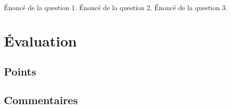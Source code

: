 \documentclass[12pt,addpoints,french,a4paper,oneside]{exam}
\begin{document}
\pagestyle{foot}


\begin{questions}

	\question[3] Énoncé de la question 1.
	\question[2] Énoncé de la question 2.
	\question[3] Énoncé de la question 3.

\end{questions}

\newpage

\thispagestyle{headandfoot}

\section*{Évaluation}

\subsection*{Points}

\begin{center}
	\gradetable[h][questions]
\end{center}

\subsection*{Commentaires}

\end{document}
